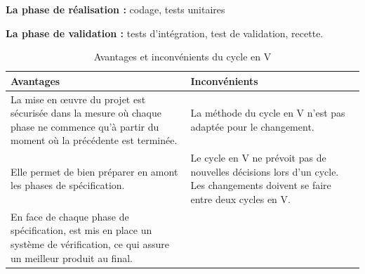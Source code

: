 \documentclass[a4paper, 12pt]{report}
\begin{document}
\begin{itemize}
   \textbf{La phase de réalisation :} codage, tests unitaires 

   \textbf{La phase de validation :} tests d’intégration, test de validation, recette. 
  
\begin{table}[H]
\begin{tabular}{|p{6cm}|p{6cm}|} 
\hline  
\centering \textbf{Avantages} & \raggedright  \textbf{Inconvénients} \tabularnewline  
\hline
\raggedright La mise en œuvre du projet est sécurisée dans la mesure où chaque phase ne commence qu'à partir du moment où la précédente est terminée. &  La méthode du cycle en V n’est pas adaptée pour le changement.   \tabularnewline  
\hline  
\raggedright Elle permet de bien préparer en amont les phases de spécification.  & Le cycle en V ne prévoit pas de nouvelles décisions lors d’un cycle. Les changements doivent se faire entre deux cycles en V.  \tabularnewline
\hline
\raggedright En face de chaque phase de spécification, est mis en place un système de vérification, ce qui assure un meilleur produit au final.  &  \tabularnewline
\hline
\end{tabular}
\caption{ Avantages et inconvénients du cycle en V}
\end{table}


\end{itemize}
\end{document}
